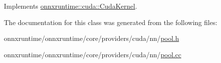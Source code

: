Implements \mbox{\hyperlink{classonnxruntime_1_1cuda_1_1CudaKernel_aca7af04ae448017d6023d30bba231ebb}{onnxruntime\+::cuda\+::\+Cuda\+Kernel}}.



The documentation for this class was generated from the following files\+:\begin{DoxyCompactItemize}
\item 
onnxruntime/onnxruntime/core/providers/cuda/nn/\mbox{\hyperlink{cuda_2nn_2pool_8h}{pool.\+h}}\item 
onnxruntime/onnxruntime/core/providers/cuda/nn/\mbox{\hyperlink{cuda_2nn_2pool_8cc}{pool.\+cc}}\end{DoxyCompactItemize}
